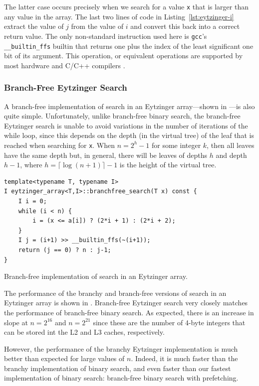 \documentclass{patmorin}
\newcommand{\lstlabel}[1]{\label{lst:#1}}
\newcommand{\lstref}[1]{Listing~\ref{lst:#1}}
\begin{document}
The latter case occurs precisely when we search for a value
\texttt{x} that is larger than any value in the array. The
last two lines of code in \lstref{eytzinger-i} extract the value of $j$
from the value of $i$ and convert this back into a correct return value.
The only non-standard instruction used here is \texttt{gcc}'s
\texttt{__builtin_ffs} builtin that returns one plus the index
of the least significant one bit of its argument.  This operation,
or equivalent operations are supported by most hardware and C/C++
compilers \cite{wiki:find}.

\subsubsection{Branch-Free Eytzinger Search}

A branch-free implementation of search in an Eytzinger array---shown
in ---is also quite simple. Unfortunately, unlike
branch-free binary search, the branch-free Eytzinger search is unable
to avoid variations in the number of iterations of the while loop,
since this depends on the depth (in the virtual tree) of the leaf that
is reached when searching for \texttt{x}.  When $n=2^h-1$ for
some integer $k$, then all leaves have the same depth but, in general,
there will be leaves of depths $h$ and depth $h-1$, where $h=\lceil\log
(n+1)\rceil-1$ is the height of the virtual tree.

\begin{listing}
\begin{verbatim}
template<typename T, typename I>
I eytzinger_array<T,I>::branchfree_search(T x) const {
    I i = 0;
    while (i < n) {
        i = (x <= a[i]) ? (2*i + 1) : (2*i + 2);
    }
    I j = (i+1) >> __builtin_ffs(~(i+1));
    return (j == 0) ? n : j-1;
}
\end{verbatim}
\caption{Branch-free implementation of search in an Eytzinger array.}
\lstlabel{eytzinger-ii}
\end{listing}

The performance of the branchy and branch-free versions of search
in an Eytzinger array is shown in .  Branch-free
Eytzinger search very closely matches the performance of branch-free
binary search. As expected, there is an increase in slope at $n=2^{16}$
and $n=2^{21}$ since these are the number of 4-byte integers that can
be stored int the L2 and L3 caches, respectively.

However, the performance of the branchy Eytzinger implementation is
much better than expected for large values of $n$. Indeed, it is much
faster than the branchy implementation of binary search, and even
faster than our fastest implementation of binary search: branch-free binary
search with prefetching.
\end{document}
